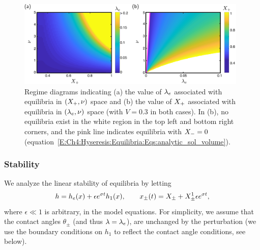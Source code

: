 \begin{figure}[t]
\centering
\includegraphics[width = 0.98\textwidth]{xright_and_hyspar_regime_diagram}
\caption{Regime diagrams indicating (a) the value of $\lambda_e$ associated with equilibria in $(X_{+}, \nu)$ space and (b) the value of $X_{+}$ associated with equilibria in $(\lambda_e, \nu)$ space (with $V = 0.3$ in both cases). In (b), no equilibria exist in the white region in the top left and bottom right corners, and the pink line indicates equilibria with $X_{-} = 0$ (equation~\eqref{E:Ch4:Hyseresis:Equilibria:Eqs:analytic_sol_volume}).}\label{fig:Ch4:Hysteresis:regime_diagrams_xright_and_hyspar_vs_nu}
\end{figure}
\subsubsection{Stability}
We analyze the linear stability of equilibria by letting
\begin{equation}\label{E:Ch4:Hyseresis:Equilibria:Stability:perturbation}
h = h_e(x) + \epsilon e^{\sigma t} h_1(x), \qquad x_{\pm}(t) = X_{\pm} +  X_{\pm}^1  \epsilon e^{\sigma t} ,
\end{equation}
where $\epsilon \ll 1$ is arbitrary, in the model equations. For simplicity, we assume that the contact angles $\theta_{\pm}$  (and thus $\lambda= \lambda_e $), are unchanged by the perturbation (we use the boundary conditions on $h_1$ to reflect the contact angle conditions, see below).

